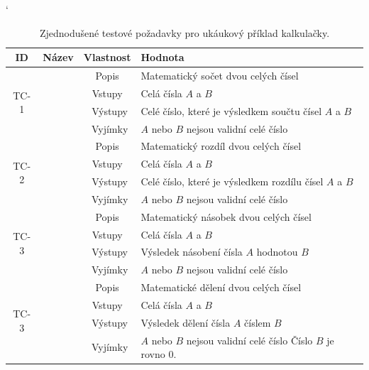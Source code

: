 \documentclass[czech, ma, kiv, he, iso690numb, pdf, viewonly]{fasthesis}
\begin{document}
    \begin{table}
        \catcode`
        \begin{tabular}{|c|c|c|p{7.5cm}|}
            \hline
            \textbf{ID} & \textbf{Název} & \textbf{Vlastnost} & \textbf{Hodnota} \\
            \hline
            \multirow{4}{*}{TC-1} & \multirow{4}{*}{Součet} & Popis & Matematický sočet dvou celých čísel \\
            \cline{3-4}
            & & Vstupy & Celá čísla \(A\) a \(B\) \\
            \cline{3-4}
            & & Výstupy & Celé číslo, které je výsledkem součtu čísel \(A\) a \(B\) \\
            \cline{3-4}
            & & Vyjímky & \(A\) nebo \(B\) nejsou validní celé číslo \\
            \hline
            \multirow{4}{*}{TC-2} & \multirow{4}{*}{Rozdíl} & Popis & Matematický rozdíl dvou celých čísel \\
            \cline{3-4}
            & & Vstupy & Celá čísla \(A\) a \(B\) \\
            \cline{3-4}
            & & Výstupy & Celé číslo, které je výsledkem rozdílu čísel \(A\) a \(B\) \\
            \cline{3-4}
            & & Vyjímky & \(A\) nebo \(B\) nejsou validní celé číslo \\
            \hline
            \multirow{4}{*}{TC-3} & \multirow{4}{*}{Násobení} & Popis & Matematický násobek dvou celých čísel \\
            \cline{3-4}
            & & Vstupy & Celá čísla \(A\) a \(B\) \\
            \cline{3-4}
            & & Výstupy & Výsledek násobení čísla \(A\) hodnotou \(B\) \\
            \cline{3-4}
            & & Vyjímky & \(A\) nebo \(B\) nejsou validní celé číslo \\
            \hline
            \multirow{4}{*}{TC-3} & \multirow{4}{*}{Dělení} & Popis & Matematické dělení dvou celých čísel \\
            \cline{3-4}
            & & Vstupy & Celá čísla \(A\) a \(B\) \\
            \cline{3-4}
            & & Výstupy & Výsledek dělení čísla \(A\) číslem \(B\) \\
            \cline{3-4}
            & & Vyjímky & \(A\) nebo \(B\) nejsou validní celé číslo \newline Číslo \(B\) je rovno \(0\). \\
            \hline
        \end{tabular}
        \centering
        \caption{Zjednodušené testové požadavky pro ukáukový příklad kalkulačky.}
        \label{tab:calc_tets_cases}
    \end{table}
\end{document}
